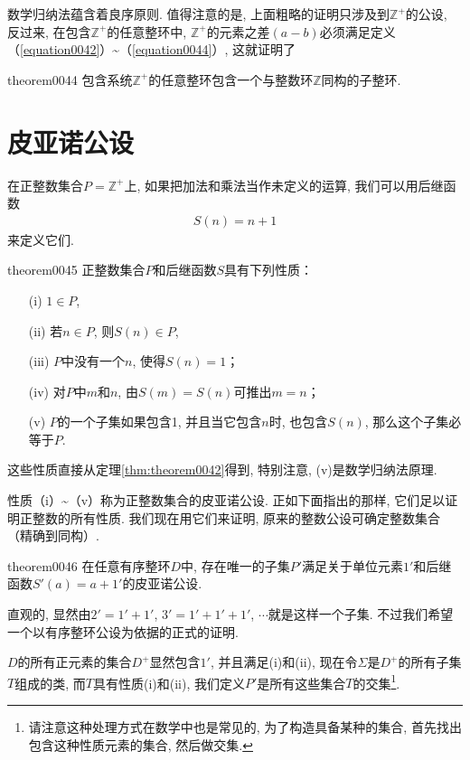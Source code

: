数学归纳法蕴含着良序原则. 值得注意的是, 上面粗略的证明只涉及到$\mathbb{Z}^+$的公设, 反过来, 在包含$\mathbb{Z}^+$的任意整环中, $\mathbb{Z}^+$的元素之差$(a-b)$必须满足定义（\ref{equation0042}）\textasciitilde（\ref{equation0044}）, 这就证明了
\begin{theorem}{}{theorem0044}
包含系统$\mathbb{Z}^+$的任意整环包含一个与整数环$\mathbb{Z}$同构的子整环. 
\end{theorem}


\section{皮亚诺公设}\label{section0010206}
在正整数集合$P=\mathbb{Z}^+$上, 如果把加法和乘法当作未定义的运算, 我们可以用后继函数
\begin{gather}\label{equation0045}
S(n)=n+1
\end{gather}
来定义它们. 

\begin{theorem}{}{theorem0045}
正整数集合$P$和后继函数$S$具有下列性质：
\begin{enumerate}
\item[(i)] $1 \in P$, 
\item[(ii)] 若$n \in P$, 则$S(n) \in P$, 
\item[(iii)] $P$中没有一个$n$, 使得$S(n)=1$；
\item[(iv)] 对$P$中$m$和$n$, 由$S(m)=S(n)$可推出$m=n$；
\item[(v)] $P$的一个子集如果包含1, 并且当它包含$n$时, 也包含$S(n)$, 那么这个子集必等于$P$. 
\end{enumerate}
\end{theorem}

这些性质直接从定理\ref{thm:theorem0042}得到, 特别注意, (v)是数学归纳法原理. 

性质（i）\textasciitilde（v）称为正整数集合的皮亚诺公设. 正如下面指出的那样, 它们足以证明正整数的所有性质. 我们现在用它们来证明, 原来的整数公设可确定整数集合（精确到同构）. 

\begin{theorem}{}{theorem0046}
在任意有序整环$D$中, 存在唯一的子集$P'$满足关于单位元素$1'$和后继函数$S'(a)=a+1'$的皮亚诺公设. 
\end{theorem}

直观的, 显然由$2'=1'+1'$, $3'=1'+1'+1'$, $\cdots$就是这样一个子集. 不过我们希望一个以有序整环公设为依据的正式的证明. 

$D$的所有正元素的集合$D^+$显然包含$1'$, 并且满足(i)和(ii), 现在令$\Sigma$是$D^+$的所有子集$T$组成的类, 而$T$具有性质(i)和(ii), 我们定义$P'$是所有这些集合$T$的交集\footnote{请注意这种处理方式在数学中也是常见的, 为了构造具备某种的集合, 首先找出包含这种性质元素的集合, 然后做交集. }. 

